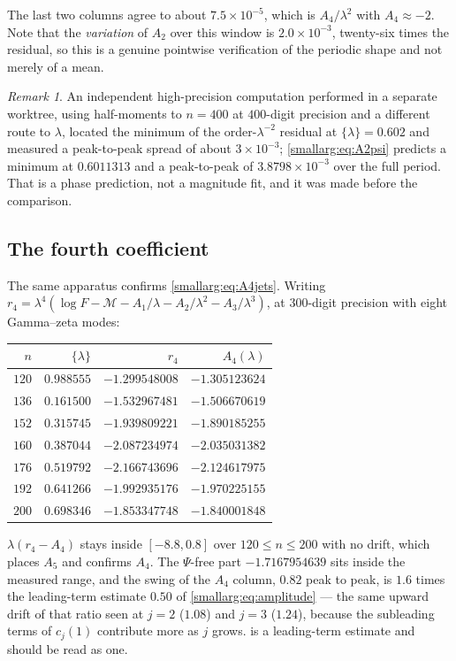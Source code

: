 \documentclass[11pt,oneside]{article}
\theoremstyle{definition}
\theoremstyle{remark}
\newtheorem{remark}[remark]{Remark}
\begin{document}
The last two columns agree to about $7.5\times10^{-5}$, which is
$A_4/\lambda^2$ with $A_4\approx-2$.  Note that the \emph{variation} of $A_2$
over this window is $2.0\times10^{-3}$, twenty-six times the residual, so this
is a genuine pointwise verification of the periodic shape and not merely of a
mean.

\begin{remark}
An independent high-precision computation performed in a separate worktree,
using half-moments to $n=400$ at $400$-digit precision and a different route to
$\lambda$, located the minimum of the order-$\lambda^{-2}$ residual at
$\{\lambda\}=0.602$ and measured a peak-to-peak spread of about
$3\times10^{-3}$; \cref{smallarg:eq:A2psi} predicts a minimum at $0.6011313$ and a
peak-to-peak of $3.8798\times10^{-3}$ over the full period.  That is a phase
prediction, not a magnitude fit, and it was made before the comparison.
\end{remark}

\subsection{The fourth coefficient}

The same apparatus confirms \cref{smallarg:eq:A4jets}.  Writing
$r_4=\lambda^4(\log F-\mathcal M-A_1/\lambda-A_2/\lambda^2-A_3/\lambda^3)$,
at $300$-digit precision with eight Gamma--zeta modes:

\begin{center}\small
\begin{tabular}{@{}rrrr@{}}
\toprule
$n$ & $\{\lambda\}$ & $r_4$ & $A_4(\lambda)$\\
\midrule
$120$ & $0.988555$ & $-1.299548008$ & $-1.305123624$\\
$136$ & $0.161500$ & $-1.532967481$ & $-1.506670619$\\
$152$ & $0.315745$ & $-1.939809221$ & $-1.890185255$\\
$160$ & $0.387044$ & $-2.087234974$ & $-2.035031382$\\
$176$ & $0.519792$ & $-2.166743696$ & $-2.124617975$\\
$192$ & $0.641266$ & $-1.992935176$ & $-1.970225155$\\
$200$ & $0.698346$ & $-1.853347748$ & $-1.840001848$\\
\bottomrule
\end{tabular}
\end{center}

$\lambda(r_4-A_4)$ stays inside $[-8.8,0.8]$ over $120\le n\le200$ with no
drift, which places $A_5$ and confirms $A_4$.  The $\Psi$-free part
$-1.7167954639$ sits inside the measured range, and the swing of the
$A_4$ column, $0.82$ peak to peak, is $1.6$ times the leading-term estimate
$0.50$ of \cref{smallarg:eq:amplitude} --- the same upward drift of that ratio seen
at $j=2$ ($1.08$) and $j=3$ ($1.24$), because the subleading terms of
$c_j(1)$ contribute more as $j$ grows.   is a
leading-term estimate and should be read as one.
\end{document}
